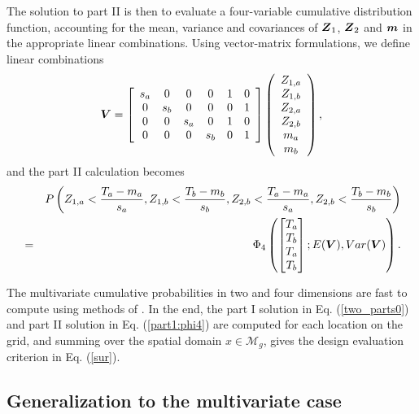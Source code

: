 \documentclass[aoas]{imsart}
\begin{document}
The solution to part II is then to evaluate a four-variable cumulative distribution function, accounting for the mean, variance and covariances of ${\boldsymbol Z}_1$, ${\boldsymbol Z}_2$ and ${\boldsymbol m}$ in the appropriate linear combinations. Using vector-matrix formulations, we define linear combinations
\begin{equation}\label{Vcomb}
    \bV=\left[
    \begin{array}{cccccc}
        s_a & 0 & 0 & 0 & 1 & 0 \\
         0 & s_b & 0 & 0 & 0 & 1 \\
         0 & 0 & s_a & 0 & 1 & 0\\
         0 & 0 & 0 & s_b & 0 & 1\\
    \end{array}
    \right] 
    \left(
    \begin{array}{cccccc}
         Z_{1,a} \\
         Z_{1,b} \\
         Z_{2,a} \\
         Z_{2,b} \\
         m_{a} \\
         m_{b}
    \end{array}
    \right),
\end{equation}
and the part II calculation becomes
\begin{eqnarray}\label{part1:phi4}
&& P \left( Z_{1,a} < \frac{T_a-m_{a}}{s_{a}}, 
Z_{1,b} < \frac{T_b-m_{b}}{s_{b}},Z_{2,b} < \frac{T_a-m_{a}}{s_{a}}, 
Z_{2,b} < \frac{T_b-m_{b}}{s_{b}} \right)  \\
&=&  \Phi_4 
\begin{pmatrix} 
\begin{bmatrix} T_a\\
T_b \\
T_a \\
T_b
\end{bmatrix};
E( \bV),Var(\bV)
\end{pmatrix} \nonumber.
\end{eqnarray}

The multivariate cumulative probabilities in two and four dimensions are fast to compute using methods of \cite{genz2009computation}.
In the end, the part I solution in Eq. (\ref{two_parts0}) and part II solution in Eq. (\ref{part1:phi4}) are computed for each location on the grid, and summing over the spatial domain $x \in \mathcal{M}_g$, gives the design evaluation criterion in Eq. (\ref{sur}).


\subsection{Generalization to the multivariate case}
\end{document}
